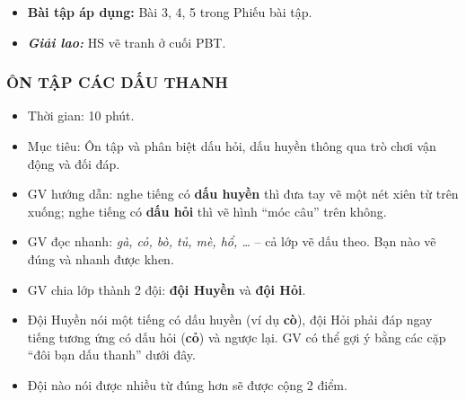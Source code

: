 \documentclass[../main.tex]{subfiles}
\begin{document}
\begin{itemize}
    \item[-] \textbf{Bài tập áp dụng:} Bài 3, 4, 5 trong Phiếu bài tập.
    \item[-] \textbf{\textit{Giải lao:}} HS vẽ tranh ở cuối PBT.
\end{itemize}

\subsubsection{ÔN TẬP CÁC DẤU THANH}
\begin{hd}
    \begin{itemize}
        \item Thời gian: 10 phút.
        \item Mục tiêu: Ôn tập và phân biệt dấu hỏi, dấu huyền thông qua trò chơi vận động và đối đáp.
    \end{itemize}
\end{hd}
\begin{itemize}
    \item[-] GV hướng dẫn: nghe tiếng có \textbf{dấu huyền} thì đưa tay vẽ một nét xiên từ trên xuống; nghe tiếng có \textbf{dấu hỏi} thì vẽ hình “móc câu” trên không.
    \item[-] GV đọc nhanh: \textit{gà, cỏ, bò, tủ, mè, hổ, \dots} -- cả lớp vẽ dấu theo. Bạn nào vẽ đúng và nhanh được khen.
\end{itemize}
\begin{itemize}
    \item[-] GV chia lớp thành 2 đội: \textbf{đội Huyền} và \textbf{đội Hỏi}.
    \item[-] Đội Huyền nói một tiếng có dấu huyền (ví dụ \textbf{cò}), đội Hỏi phải đáp ngay tiếng tương ứng có dấu hỏi (\textbf{cỏ}) và ngược lại. GV có thể gợi ý bằng các cặp “đôi bạn dấu thanh” dưới đây.
    \item[-] Đội nào nói được nhiều từ đúng hơn sẽ được cộng 2 điểm.
\end{itemize}
\end{document}
